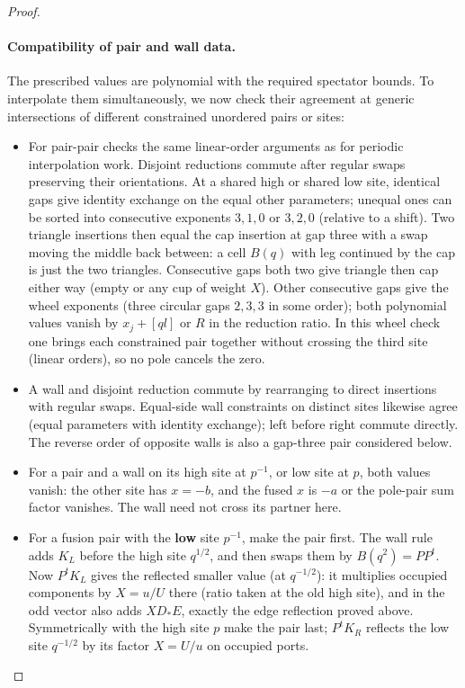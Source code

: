 \documentclass[11pt]{article}
\numberwithin{equation}{section}
\theoremstyle{definition}\newtheorem{definition}[theorem]{Definition}
\theoremstyle{remark}\newtheorem{remark}[theorem]{Remark}
\begin{document}
\begin{proof}
\paragraph{Compatibility of pair and wall data.}
The prescribed values are polynomial with the required spectator bounds.
To interpolate them simultaneously, we now check their agreement at generic
intersections of different constrained unordered pairs or sites:
\begin{itemize}
\item For pair-pair checks the same linear-order arguments as for periodic interpolation work. Disjoint reductions commute after regular swaps preserving their orientations. At a shared high or shared low site, identical gaps give identity exchange on the equal other parameters; unequal ones can be sorted into consecutive exponents \(3,1,0\) or \(3,2,0\) (relative to a shift). Two triangle insertions then equal the cap insertion at gap three with a swap moving the middle back between: a cell \(B(q)\) with leg continued by the cap is just the two triangles. Consecutive gaps both two give triangle then cap either way (empty or any cup of weight \(X\)). Other consecutive gaps give the wheel exponents (three circular gaps \(2,3,3\) in some order); both polynomial values vanish by \(x_j+[q l]\) or \(R\) in the reduction ratio. In this wheel check one brings each constrained pair together without crossing the third site (linear orders), so no pole cancels the zero.
\item A wall and disjoint reduction commute by rearranging to direct insertions with regular swaps. Equal-side wall constraints on distinct sites likewise agree (equal parameters with identity exchange); left before right commute directly. The reverse order of opposite walls is also a gap-three pair considered below.
\item For a pair and a wall on its high site at \(p^{-1}\), or low site at \(p\), both values vanish: the other site has \(x=-b\), and the fused \(x\) is \(-a\) or the pole-pair sum factor vanishes. The wall need not cross its partner here.
\item For a fusion pair with the \textbf{low} site \(p^{-1}\), make the pair first. The wall rule adds \(K_L\) before the high site \(q^{1/2}\), and then swaps them by \(B(q^2)=P P^t\). Now \(P^t K_L\) gives the reflected smaller value (at \(q^{-1/2}\)): it multiplies occupied components by \(X=u/U\) there (ratio taken at the old high site), and in the odd vector also adds \(X D_* E\), exactly the edge reflection proved above. Symmetrically with the high site \(p\) make the pair last; \(P^t K_R\) reflects the low site \(q^{-1/2}\) by its factor \(X=U/u\) on occupied ports.

\end{itemize}
\end{proof}
\end{document}
